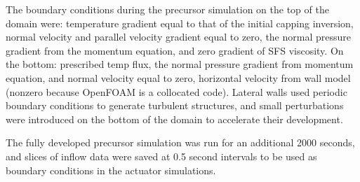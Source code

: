 
The boundary conditions during the precursor simulation on the top of the domain were: temperature gradient equal to that of the initial capping inversion, normal velocity  and parallel velocity gradient equal to zero, the normal pressure gradient from the momentum equation, and zero gradient of SFS viscosity.  On the bottom: prescribed temp flux, the normal pressure gradient from momentum equation, and normal velocity equal to zero, horizontal velocity from wall model (nonzero because OpenFOAM is a collocated code).  Lateral walls used periodic boundary conditions to generate turbulent structures, and small perturbations were introduced on the bottom of the domain to accelerate their development.

The fully developed precursor simulation was run for an additional 2000 seconds, and slices of inflow data were saved at 0.5 second intervals to be used as boundary conditions in the actuator simulations.

